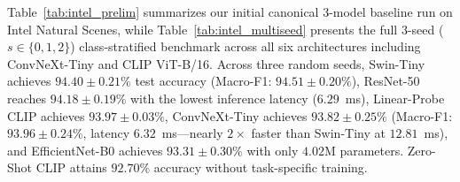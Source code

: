 \documentclass[final,5p,times,twocolumn]{elsarticle}
\begin{document}
Table~\ref{tab:intel_prelim} summarizes our initial canonical 3-model baseline run on Intel Natural Scenes, while Table~\ref{tab:intel_multiseed} presents the full 3-seed ($s \in \{0, 1, 2\}$) class-stratified benchmark across all six architectures including ConvNeXt-Tiny and CLIP ViT-B/16. Across three random seeds, Swin-Tiny achieves $94.40 \pm 0.21\%$ test accuracy (Macro-F1: $94.51 \pm 0.20\%$), ResNet-50 reaches $94.18 \pm 0.19\%$ with the lowest inference latency ($6.29$~ms), Linear-Probe CLIP achieves $93.97 \pm 0.03\%$, ConvNeXt-Tiny achieves $93.82 \pm 0.25\%$ (Macro-F1: $93.96 \pm 0.24\%$, latency $6.32$~ms---nearly $2\times$ faster than Swin-Tiny at $12.81$~ms), and EfficientNet-B0 achieves $93.31 \pm 0.30\%$ with only $4.02$M parameters. Zero-Shot CLIP attains $92.70\%$ accuracy without task-specific training.

\begin{table}[t!]
\centering
\caption{Paired McNemar Statistical Significance Tests Between Architectures on Intel Natural Scenes ($N=3,000$ Test Images).}
\label{tab:mcnemar_intel}
\end{table}
\end{document}
